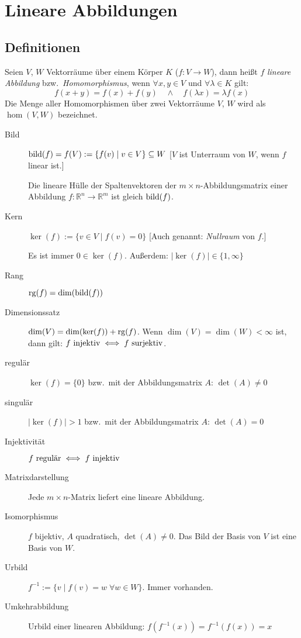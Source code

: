 

\chapter{Lineare Abbildungen}



\section{Definitionen}

Seien $V$, $W$ Vektorräume über einem Körper $K$ ($f:V\to W$), dann heißt $f$ \emph{lineare Abbildung} bzw.~\emph{Homomorphismus},
wenn $\forall x,y\in V$ und $\forall\lambda\in K$ gilt:
\[ f(x+y)=f(x)+f(y) \quad \land \quad f(\lambda x)=\lambda f(x) \]
Die Menge aller Homomorphismen über zwei Vektorräume $V$, $W$ wird als $\hom(V,W)$ bezeichnet.
\begin{description}
  \item [{Bild}] 
	$\operatorname{bild}(f) = f(V) := \{ f(v) \mid v \in V \} \subseteq W$
	[$V$ ist Unterraum von $W$, wenn $f$ linear ist.]

	Die lineare Hülle der Spaltenvektoren der $m\times n$-Abbildungsmatrix einer Abbildung $f:\mathbb{R}^{n}\to\mathbb{R}^{m}$ ist gleich $\operatorname{bild}(f)$.
  \item [{Kern}] 
	$\ker(f):=\{ v\in V \mid f(v)=0 \}$
    [Auch genannt: \emph{Nullraum} von $f$.]
    
    Es ist immer $0\in\ker(f)$.
	Außerdem: $\lvert \ker(f) \rvert \in \{ 1,\infty\} $
  \item [{Rang}] 
	$\operatorname{rg}(f)=\dim(\operatorname{bild}(f))$
  \item [{Dimensionssatz}] 
	$\dim(V)=\dim(\ker(f))+\operatorname{rg}(f)$.
    Wenn $\dim(V)=\dim(W)<\infty$ ist, dann gilt: $f \hbox{ injektiv} \iff f \hbox{ surjektiv}$.
  \item [{regulär}] 
	$\ker(f)=\{0\}$ bzw.~mit der Abbildungsmatrix $A$: $\det(A)\neq0$
  \item [{singulär}] 
	$\lvert \ker(f) \rvert > 1$ bzw.~mit der Abbildungsmatrix $A$: $\det(A)=0$
  \item [{Injektivität}]
	$f \hbox{ regulär} \iff f \hbox{ injektiv}$
  \item [{Matrixdarstellung}]
	Jede $m\times n$-Matrix liefert eine lineare Abbildung.
  \item [{Isomorphismus}]
	$f$ bijektiv, $A$ quadratisch, $\det(A)\neq0$. Das Bild der Basis von $V$ ist eine Basis von $W$.
  \item [{Urbild}] 
	$f^{-1}:=\{ v \mid f(v)=w\;\forall w\in W\} $. Immer vorhanden.
  \item [{Umkehrabbildung}] 
	Urbild einer linearen Abbildung: $f(f^{-1}(x))=f^{-1}(f(x))=x$
\end{description}

